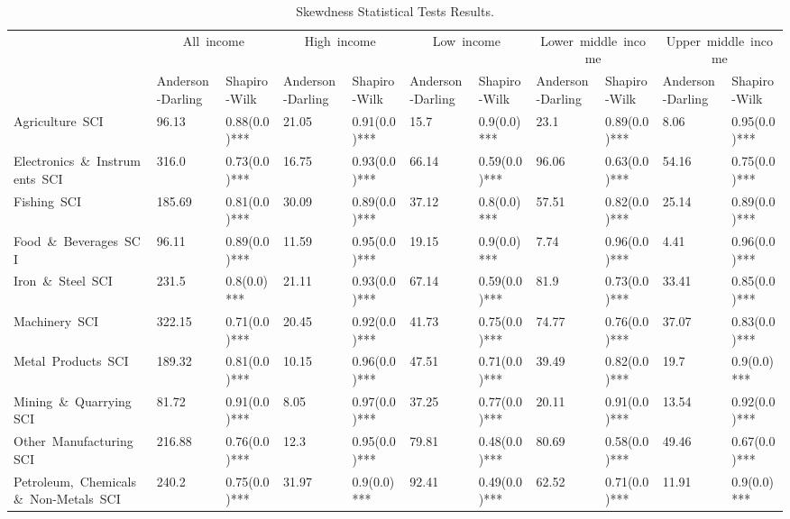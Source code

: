 \documentclass[10pt]{article}
\begin{document}
\begin{table}
	\centering
	\caption{Skewdness Statistical Tests Results.}
      \label{tab:skewdness-test}
\begin{adjustbox}{width=\textwidth,center}
      \begin{tabular}{lllllllllll}
      \toprule
       & \multicolumn{2}{c}{All\ income} & \multicolumn{2}{c}{High\ income} & \multicolumn{2}{c}{Low\ income} & \multicolumn{2}{c}{Lower\ middle\ income} & \multicolumn{2}{c}{Upper\ middle\ income} \\
       & Anderson-Darling & Shapiro-Wilk & Anderson-Darling & Shapiro-Wilk & Anderson-Darling & Shapiro-Wilk & Anderson-Darling & Shapiro-Wilk & Anderson-Darling & Shapiro-Wilk \\
      \midrule
      Agriculture\ SCI & 96.13 & 0.88(0.0)*** & 21.05 & 0.91(0.0)*** & 15.7 & 0.9(0.0)*** & 23.1 & 0.89(0.0)*** & 8.06 & 0.95(0.0)*** \\
      Electronics\ \&\ Instruments\ SCI & 316.0 & 0.73(0.0)*** & 16.75 & 0.93(0.0)*** & 66.14 & 0.59(0.0)*** & 96.06 & 0.63(0.0)*** & 54.16 & 0.75(0.0)*** \\
      Fishing\ SCI & 185.69 & 0.81(0.0)*** & 30.09 & 0.89(0.0)*** & 37.12 & 0.8(0.0)*** & 57.51 & 0.82(0.0)*** & 25.14 & 0.89(0.0)*** \\
      Food\ \&\ Beverages\ SCI & 96.11 & 0.89(0.0)*** & 11.59 & 0.95(0.0)*** & 19.15 & 0.9(0.0)*** & 7.74 & 0.96(0.0)*** & 4.41 & 0.96(0.0)*** \\
      Iron\ \&\ Steel\ SCI & 231.5 & 0.8(0.0)*** & 21.11 & 0.93(0.0)*** & 67.14 & 0.59(0.0)*** & 81.9 & 0.73(0.0)*** & 33.41 & 0.85(0.0)*** \\
      Machinery\ SCI & 322.15 & 0.71(0.0)*** & 20.45 & 0.92(0.0)*** & 41.73 & 0.75(0.0)*** & 74.77 & 0.76(0.0)*** & 37.07 & 0.83(0.0)*** \\
      Metal\ Products\ SCI & 189.32 & 0.81(0.0)*** & 10.15 & 0.96(0.0)*** & 47.51 & 0.71(0.0)*** & 39.49 & 0.82(0.0)*** & 19.7 & 0.9(0.0)*** \\
      Mining\ \&\ Quarrying\ SCI & 81.72 & 0.91(0.0)*** & 8.05 & 0.97(0.0)*** & 37.25 & 0.77(0.0)*** & 20.11 & 0.91(0.0)*** & 13.54 & 0.92(0.0)*** \\
      Other\ Manufacturing\ SCI & 216.88 & 0.76(0.0)*** & 12.3 & 0.95(0.0)*** & 79.81 & 0.48(0.0)*** & 80.69 & 0.58(0.0)*** & 49.46 & 0.67(0.0)*** \\
      Petroleum,\ Chemicals\ \&\ Non-Metals\ SCI & 240.2 & 0.75(0.0)*** & 31.97 & 0.9(0.0)*** & 92.41 & 0.49(0.0)*** & 62.52 & 0.71(0.0)*** & 11.91 & 0.9(0.0)*** \\

\end{tabular}
\end{adjustbox}
\end{table}
\end{document}
